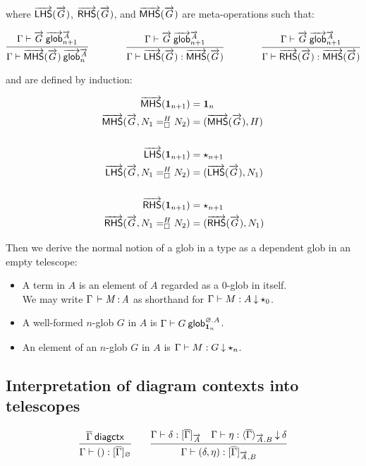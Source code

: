 where $\lhs{\tel G}$, $\rhs{\tel G}$, and $\mhs{\tel G}$ are meta-operations
such that:

\[
\infer
  {\wfglob{\Gamma}{\mhs{\tel G}}{\tel A}n}
  {\wfglob{\Gamma}{\tel G}{\tel A}{n+1}}
\qquad\qquad
\infer
  {\ofglob{\Gamma}{\lhs{\tel G}}{\mhs{\tel G}}}
  {\wfglob{\Gamma}{\tel G}{\tel A}{n+1}}
\qquad\qquad
\infer
  {\ofglob{\Gamma}{\rhs{\tel G}}{\mhs{\tel G}}}
  {\wfglob{\Gamma}{\tel G}{\tel A}{n+1}}
\]

and are defined by induction:

\[\begin{aligned}
\mhs{\unitglob{n+1}} &= \unitglob n \\
\mhs{\tel G,\dhomj{H}{N_1}{N_2}{\blank}} &= (\mhs{\tel G},H) \\
&\\
\lhs{\unitglob{n+1}} &= \unitglobelt{n+1} \\
\lhs{\tel G,\dhomj{H}{N_1}{N_2}{\blank}} &= (\lhs{\tel G},N_1) \\
&\\
\rhs{\unitglob{n+1}} &= \unitglobelt{n+1} \\
\rhs{\tel G,\dhomj{H}{N_1}{N_2}{\blank}} &= (\rhs{\tel G},N_1)
\end{aligned}\]

Then we derive the normal notion of a glob in a type as a dependent glob in an
empty telescope:
\begin{itemize}
\item A term in $A$ is an element of $A$ regarded as a $0$-glob in itself. \\
We may write $\oftp{\Gamma}{M}{A}$ as shorthand for
$\ofdepglob{\Gamma}{M}{A}{\unitglobelt 0}$.

\item A well-formed $n$-glob $G$ in $A$ is 
$\wfdepglob{\Gamma}{G}{\emptyctx.A}{\unitglob n}$.

\item An element of an $n$-glob $G$ in $A$ is
$\ofdepglob{\Gamma}{M}{G}{\unitglobelt n}$.
\end{itemize}

\subsection{Interpretation of diagram contexts into telescopes}

\begin{small}
\[\infer
    {\ofinterp{\Gamma}{()}{\diag\Gamma}{\emptytel}}
    {\wfdiagctx{\diag\Gamma}}
  \qquad
  \infer
    {\ofinterp{\Gamma}{(\delta,\eta)}{\diag\Gamma}{\tel A,B}}
    {\ofinterp{\Gamma}{\delta}{\diag\Gamma}{\tel A}
    &\ofinterpdep{\Gamma}{\eta}{\diag\Gamma}{\tel A.B}{\delta}}
\]
\end{small}

